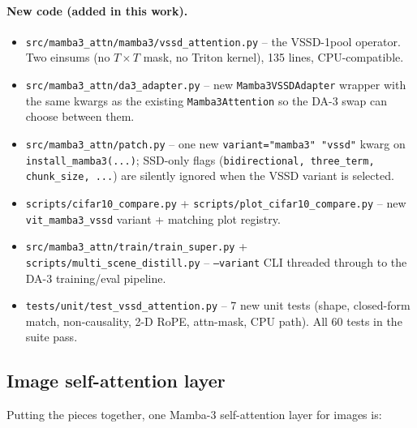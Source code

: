 \documentclass[11pt,a4paper]{article}
\begin{document}
\paragraph{New code (added in this work).}
\begin{itemize}
  \item \texttt{src/\allowbreak{}mamba3\_\allowbreak{}attn/\allowbreak{}mamba3/\allowbreak{}vssd\_\allowbreak{}attention.py} -- the
        VSSD-1pool operator. Two einsums (no $T\times T$ mask, no
        Triton kernel), 135 lines, CPU-compatible.
  \item \texttt{src/\allowbreak{}mamba3\_\allowbreak{}attn/\allowbreak{}da3\_\allowbreak{}adapter.py} -- new
        \texttt{Mamba3VSSDAdapter} wrapper with the same kwargs as
        the existing \texttt{Mamba3Attention} so the DA-3 swap can
        choose between them.
  \item \texttt{src/\allowbreak{}mamba3\_\allowbreak{}attn/\allowbreak{}patch.py} -- one new
        \texttt{variant="mamba3" \textbar{} "vssd"} kwarg on
        \texttt{install\_\allowbreak{}mamba3(...)}; SSD-only flags
        (\texttt{bidirectional, three\_\allowbreak{}term, chunk\_\allowbreak{}size, ...}) are
        silently ignored when the VSSD variant is selected.
  \item \texttt{scripts/\allowbreak{}cifar10\_\allowbreak{}compare.py} +
        \texttt{scripts/\allowbreak{}plot\_\allowbreak{}cifar10\_\allowbreak{}compare.py} -- new
        \texttt{vit\_mamba3\_vssd} variant + matching plot registry.
  \item \texttt{src/\allowbreak{}mamba3\_\allowbreak{}attn/\allowbreak{}train/\allowbreak{}train\_\allowbreak{}super.py} +
        \texttt{scripts/\allowbreak{}multi\_\allowbreak{}scene\_\allowbreak{}distill.py} --
        \texttt{--variant} CLI threaded through to the DA-3
        training/eval pipeline.
  \item \texttt{tests/\allowbreak{}unit/\allowbreak{}test\_\allowbreak{}vssd\_\allowbreak{}attention.py} -- 7 new unit
        tests (shape, closed-form match, non-causality, 2-D RoPE,
        attn-mask, CPU path). All 60 tests in the suite pass.
\end{itemize}

\subsection{Image self-attention layer}

Putting the pieces together, one Mamba-3 self-attention layer for
images is:
\end{document}
